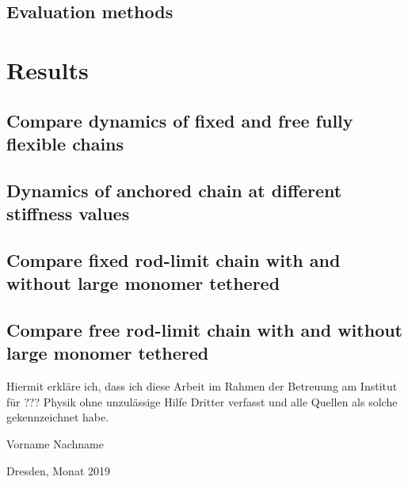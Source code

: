 \documentclass[
    paper=A4,pagesize=automedia,fontsize=12pt,
    BCOR=15mm,DIV=22,
    twoside,headinclude,footinclude=false,
    ngerman,fleqn,             %
    bibliography=totocnumbered,          %
    listof=totoc,                %
    listof=flat,                 %
    cleardoublepage=empty      %
    numbers=endperiod
]{scrartcl}
\begin{document}
\subsection{Evaluation methods}

\section{Results}
\subsection{Compare dynamics of fixed and free fully flexible chains}
\subsection{Dynamics of anchored chain at different stiffness values}
\subsection{Compare fixed rod-limit chain with and without large monomer tethered}
\subsection{Compare free rod-limit chain with and without large monomer tethered}

\clearpage
\thispagestyle{empty}
\vspace*{1.5em}

Hiermit erkläre ich, dass ich diese Arbeit im Rahmen der Betreuung am Institut
für ??? Physik ohne unzulässige Hilfe Dritter verfasst und alle Quellen als solche gekennzeichnet habe.

\vspace*{45em}

Vorname Nachname \par
Dresden, Monat 2019



\end{document}
